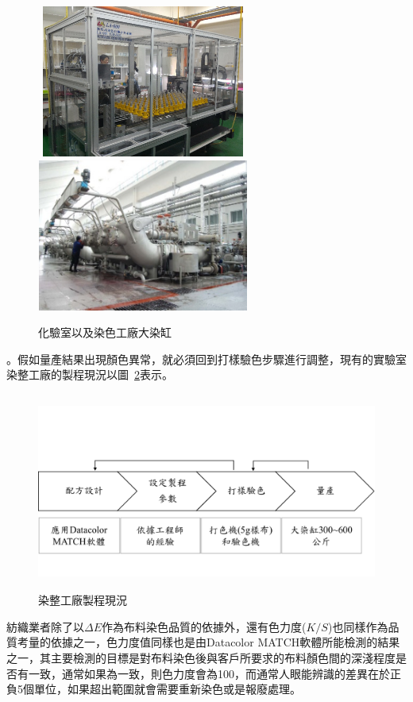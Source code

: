 \begin{figure}[!htbp]
\centering
\includegraphics[width=7cm, height=5cm]{Graph/lab.png}
\includegraphics[width=7cm, height=5cm]{Graph/process.png}
\caption{化驗室以及染色工廠大染缸}
\label{fig:factory}
\end{figure}
。假如量產結果出現顏色異常，就必須回到打樣驗色步驟進行調整，現有的實驗室染整工廠的製程現況以圖~\ref{fig:flow2}表示。
\begin{figure} 
\centering
\includegraphics[width=14cm, height=6.5cm]{Graph/flowChart2.pdf}
\caption{染整工廠製程現況}
\label{fig:flow2}
\end{figure}
紡織業者除了以$\Delta E$作為布料染色品質的依據外，還有色力度($K/S$)也同樣作為品質考量的依據之一，色力度值同樣也是由Datacolor MATCH軟體所能檢測的結果之一，其主要檢測的目標是對布料染色後與客戶所要求的布料顏色間的深淺程度是否有一致，通常如果為一致，則色力度會為100，而通常人眼能辨識的差異在於正負5個單位，如果超出範圍就會需要重新染色或是報廢處理。

